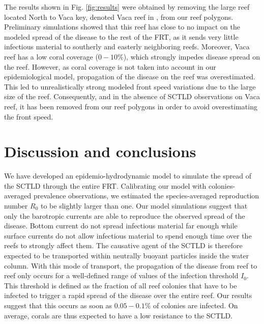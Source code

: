 \documentclass[utf8]{frontiersSCNS}
\begin{document}
The results shown in Fig. \ref{fig:results} were obtained by removing the large reef located North to Vaca key, denoted Vaca reef in \cite{frys20}, from our reef polygons. Preliminary simulations showed that this reef has close to no impact on the modeled spread of the disease to the rest of the FRT, as it sends very little infectious material to southerly and easterly neighboring reefs. Moreover, Vaca reef has a low coral coverage ($0-10\%$), which strongly impedes disease spread on the reef. However, as coral coverage is not taken into account in our epidemiological model, propagation of the disease on the reef was overestimated. This led to unrealistically strong modeled front speed variations due to the large size of the reef. Consequently, and in the absence of SCTLD observations on Vaca reef, it has been removed from our reef polygons in order to avoid overestimating the front speed.



\section{Discussion and conclusions}


We have developed an epidemio-hydrodynamic model to simulate the spread of the SCTLD through the entire FRT. Calibrating our model with colonies-averaged prevalence observations, we estimated the species-averaged reproduction number $R_0$ to be slightly larger than one. Our model simulations suggest that only the barotropic currents are able to reproduce the observed spread of the disease. Bottom current do not spread infectious material far enough while surface currents do not allow infectious material to spend enough time over the reefs to strongly affect them. The causative agent of the SCTLD is therefore expected to be transported within neutrally buoyant particles inside the water column. With this mode of transport, the propagation of the disease from reef to reef only occurs for a well-defined range of values of the infection threshold $I_0$. This threshold is defined as the fraction of all reef colonies that have to be infected to trigger a rapid spread of the disease over the entire reef. Our results suggest that this occurs as soon as $0.05-0.1\%$ of colonies are infected. On average, corals are thus expected to have a low resistance to the SCTLD.
\end{document}
